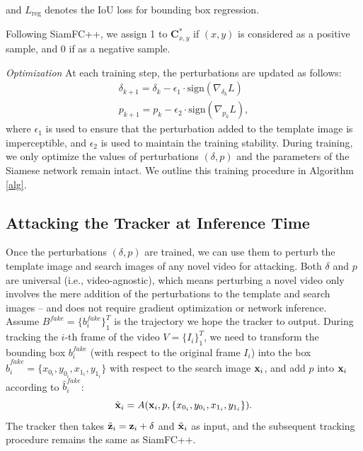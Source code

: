 \documentclass[journal]{IEEEtran}
\begin{document}

and $L_{\mathrm{reg}}$ denotes the IoU loss \cite{iou-loss} for bounding box regression.

Following SiamFC++, we assign 1 to $\textbf{C}_{x, y}^{*}$ if $(x, y)$ is considered as a positive sample, and 0 if as a negative sample.
  
\textit{Optimization} At each training step, the perturbations are updated as follows:
\begin{gather}
\delta_{k+1} = \delta_{k} - \epsilon_1 \cdot \text{sign}(\nabla_{\delta_k}L)\\
p_{k+1} = p_{k} - \epsilon_2 \cdot \text{sign}(\nabla_{p_k}L),
\end{gather}
where $\epsilon_1$ is used to ensure that the perturbation added to the template image is imperceptible, and $\epsilon_2$ is used to maintain the training stability.
During training, we only optimize the values of perturbations $(\delta, p)$ and the parameters of the Siamese network remain intact. We outline this training procedure in Algorithm \ref{alg}.

\subsection{Attacking the Tracker at Inference Time}

Once the perturbations $(\delta, p)$ are trained, we can use them to perturb the template image and search images of any novel video for attacking. Both $\delta$ and $p$ are universal (i.e., video-agnostic), which means perturbing a novel video only involves the mere addition of the perturbations to the template and search images -- and does not require gradient optimization or network inference.
Assume $B^{fake}=\{b^{fake}_i\}_1^{T}$ is the trajectory we hope the tracker to output.
During tracking the $i$-th frame of the video $V=\{I_i\}_1^T$, we need to transform the bounding box $b^{fake}_i$ (with respect to the original frame $I_i$) into the box $\hat b^{fake}_i=\{x_{0_i}, y_{0_i}, x_{1_i}, y_{1_i}\}$ with respect to the search image $\textbf x_i$, and add $p$ into $\textbf x_i$ according to $\hat b^{fake}_i$:
\begin{equation}
\tilde{\textbf x}_i = A(\textbf x_i, p, \{x_{0_i}, y_{0_i}, x_{1_i}, y_{1_i}\}).
\end{equation}
The tracker then takes $\tilde{\textbf z}_i=\textbf z_i+\delta$ and $\tilde{ \textbf x}_i$ as input, and the subsequent tracking procedure remains the same as SiamFC++.
\end{document}
